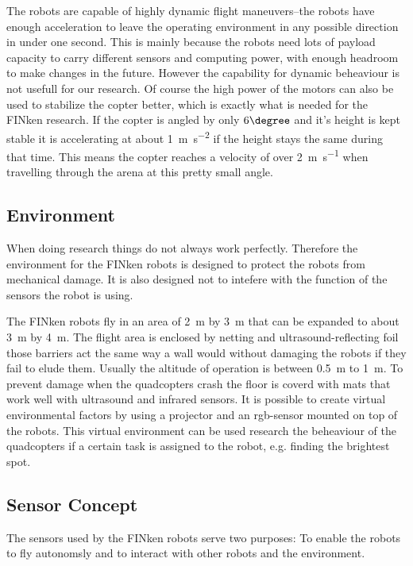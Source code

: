 The robots are capable of highly dynamic flight maneuvers–the robots have enough acceleration to leave the operating environment in any possible direction in under one second.
This is mainly because the robots need lots of payload capacity to carry different sensors and computing power, with enough headroom to make changes in the future.
However the capability for dynamic beheaviour is not usefull for our research.
Of course the high power of the motors can also be used to stabilize the copter better, which is exactly what is needed for the FINken research.
If the copter is angled by only $6\degree$ and it's height is kept stable it is accelerating at about \SI{1}{\metre\per\square\second} if the height stays the same during that time.
This means the copter reaches a velocity of over \SI{2}{\metre\per\second} when travelling through the arena at this pretty small angle. 

\subsection{Environment}
When doing research things do not always work perfectly.
Therefore the environment for the FINken robots is designed to protect the robots from mechanical damage.
It is also designed not to intefere with the function of the sensors the robot is using. 

The FINken robots fly in an area of \SI{2}{\metre} by \SI{3}{\metre} that can be expanded to about \SI{3}{\metre} by \SI{4}{\metre}.
The flight area is enclosed by netting and ultrasound-reflecting foil those barriers act the same way a wall would without damaging the robots if they fail to elude them.
Usually the altitude of operation is between \SI{0.5}{\metre} to \SI{1}{\metre}.
To prevent damage when the quadcopters crash the floor is coverd with mats that work well with ultrasound and infrared sensors.
It is possible to create virtual environmental factors by using a projector and an rgb-sensor mounted on top of the robots.
This virtual environment can be used research the beheaviour of the quadcopters if a certain task is assigned to the robot, e.g. finding the brightest spot.


\subsection{Sensor Concept}
The sensors used by the FINken robots serve two purposes: To enable the robots to fly autonomsly and to interact with other robots and the environment.

